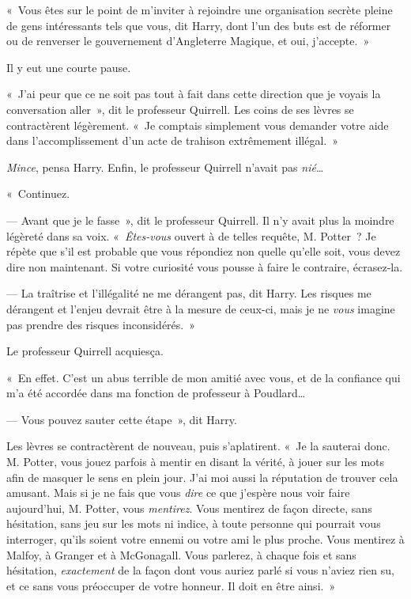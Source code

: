 «~Vous êtes sur le point de m'inviter à rejoindre une organisation secrète pleine de gens intéressants tels que vous, dit Harry, dont l'un des buts est de réformer ou de renverser le gouvernement d'Angleterre Magique, et oui, j'accepte.~»

Il y eut une courte pause.

«~J'ai peur que ce ne soit pas tout à fait dans cette direction que je voyais la conversation aller~», dit le professeur Quirrell. Les coins de ses lèvres se contractèrent légèrement. «~Je comptais simplement vous demander votre aide dans l'accomplissement d'un acte de trahison extrêmement illégal.~»

\emph{Mince}, pensa Harry. Enfin, le professeur Quirrell n'avait pas \emph{nié}…

«~Continuez.

--- Avant que je le fasse~», dit le professeur Quirrell. Il n'y avait plus la moindre légèreté dans sa voix. «~\emph{Êtes-vous} ouvert à de telles requête, M. Potter~? Je répète que s'il est probable que vous répondiez non quelle qu'elle soit, vous devez dire non maintenant. Si votre curiosité vous pousse à faire le contraire, écrasez-la.

--- La traîtrise et l'illégalité ne me dérangent pas, dit Harry. Les risques me dérangent et l'enjeu devrait être à la mesure de ceux-ci, mais je ne \emph{vous} imagine pas prendre des risques inconsidérés.~»

Le professeur Quirrell acquiesça.

«~En effet. C'est un abus terrible de mon amitié avec vous, et de la confiance qui m'a été accordée dans ma fonction de professeur à Poudlard…

--- Vous pouvez sauter cette étape~», dit Harry.

Les lèvres se contractèrent de nouveau, puis s'aplatirent. «~Je la sauterai donc. M. Potter, vous jouez parfois à mentir en disant la vérité, à jouer sur les mots afin de masquer le sens en plein jour. J'ai moi aussi la réputation de trouver cela amusant. Mais si je ne fais que vous \emph{dire} ce que j'espère nous voir faire aujourd'hui, M. Potter, vous \emph{mentirez}. Vous mentirez de façon directe, sans hésitation, sans jeu sur les mots ni indice, à toute personne qui pourrait vous interroger, qu'ils soient votre ennemi ou votre ami le plus proche. Vous mentirez à Malfoy, à Granger et à McGonagall. Vous parlerez, à chaque fois et sans hésitation, \emph{exactement} de la façon dont vous auriez parlé si vous n'aviez rien su, et ce sans vous préoccuper de votre honneur. Il doit en être ainsi.~»

